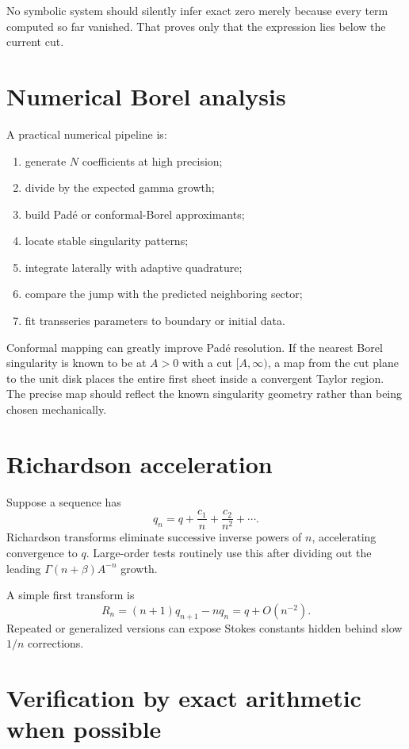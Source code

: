 \documentclass[11pt,oneside]{book}
\theoremstyle{definition}
\theoremstyle{remark}
\newcommand{\bigO}{O}
\begin{document}
No symbolic system should silently infer exact zero merely because every term
computed so far vanished. That proves only that the expression lies below the
current cut.

\section{Numerical Borel analysis}

A practical numerical pipeline is:
\begin{enumerate}
\item generate $N$ coefficients at high precision;
\item divide by the expected gamma growth;
\item build Pad\'e or conformal-Borel approximants;
\item locate stable singularity patterns;
\item integrate laterally with adaptive quadrature;
\item compare the jump with the predicted neighboring sector;
\item fit transseries parameters to boundary or initial data.
\end{enumerate}

Conformal mapping can greatly improve Pad\'e resolution. If the nearest Borel
singularity is known to be at $A>0$ with a cut $[A,\infty)$, a map from the cut
plane to the unit disk places the entire first sheet inside a convergent Taylor
region. The precise map should reflect the known singularity geometry rather
than being chosen mechanically.

\section{Richardson acceleration}

Suppose a sequence has
\[
  q_n=q+\frac{c_1}{n}+\frac{c_2}{n^2}+\cdots.
\]
Richardson transforms eliminate successive inverse powers of $n$, accelerating
convergence to $q$. Large-order tests routinely use this after dividing out the
leading $\Gamma(n+\beta)A^{-n}$ growth.

A simple first transform is
\[
  R_n=(n+1)q_{n+1}-nq_n=q+\bigO(n^{-2}).
\]
Repeated or generalized versions can expose Stokes constants hidden behind slow
$1/n$ corrections.

\section{Verification by exact arithmetic when possible}
\end{document}
